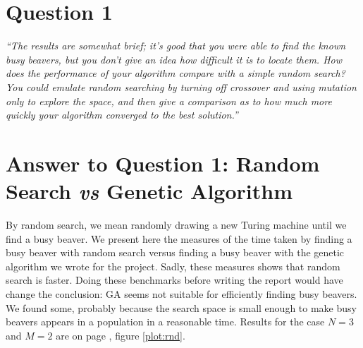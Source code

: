 %
%
%
%
%

\section*{Question 1}

\emph{``The results are somewhat brief; it's good that you were able to find
    the known busy beavers, but you don't give an idea how difficult it
    is to locate them. How does the performance of your algorithm
    compare with a simple random search? You could emulate random
    searching by turning off crossover and using mutation only to
    explore the space, and then give a comparison as to how much more
    quickly your algorithm converged to the best solution.''}

\section*{Answer to Question 1: Random Search \emph{vs} Genetic Algorithm}

By random search, we mean randomly drawing a new Turing machine until we find a busy beaver.
We present here the measures of the time taken by finding a busy beaver with random search versus finding a busy beaver with the genetic algorithm we wrote for the project. Sadly, these measures shows that random search is faster. Doing these benchmarks before writing the report would have change the conclusion: GA seems not suitable for efficiently finding busy beavers. We found some, probably because the search space is small enough to make busy beavers appears in a population in a reasonable time. Results for the case $N = 3$ and $M = 2$ are on page \pageref{plot:rnd}, figure \ref{plot:rnd}.

